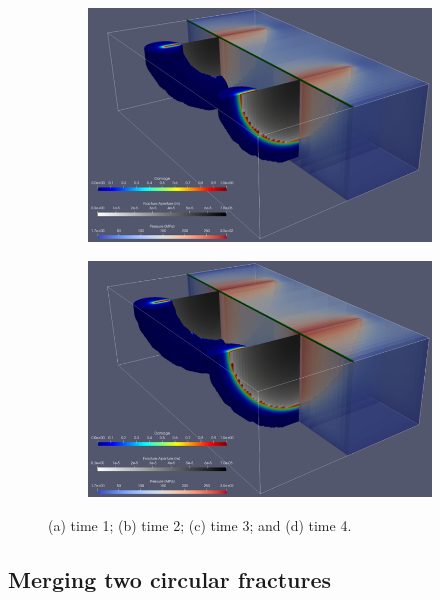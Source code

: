 \begin{figure}[h]
\bigskip
\begin{subfigure}{.45\textwidth}
  \centering
  \includegraphics[width=\linewidth]{Chapter4/figures/3D/t_60.png}
  \caption{}
  \label{fig:parallel_t_2}
\end{subfigure}
\hspace{0.85cm}
\begin{subfigure}{.45\textwidth}
  \centering
  \includegraphics[width=\linewidth]{Chapter4/figures/3D/t_90.png}
  \caption{}
  \label{fig:parallel_t_3}
\end{subfigure}
  \caption{(a) time 1; (b) time 2; (c) time 3; and (d) time 4. } 
  \label{fig:parallel_snapshots}
\end{figure}

\subsection{Merging two circular fractures}

